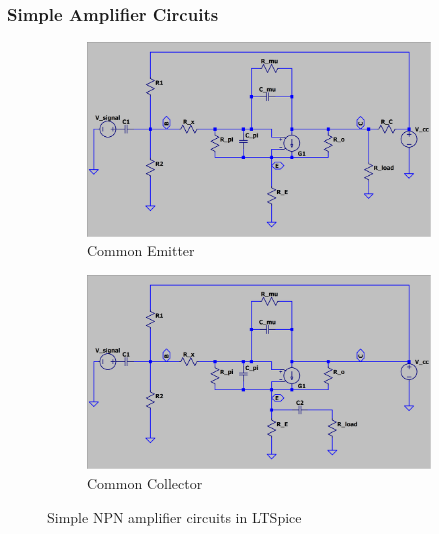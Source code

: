 \documentclass[conference]{IEEEtran}
\begin{document}
\subsubsection{Simple Amplifier Circuits}

\begin{figure}[htbp]
    \centering
    \begin{subfigure}[b]{0.45\textwidth}
        \centerline{\includegraphics[width=\textwidth]{figures/LTSpice-CE.png}}
        \caption{Common Emitter}
        \label{fig:LTSpice-CE-fig}
    \end{subfigure}
    \par\bigskip
    \begin{subfigure}[b]{0.45\textwidth}
        \centerline{\includegraphics[width=\textwidth]{figures/LTSpice-CC.png}}
        \caption{Common Collector}
        \label{fig:LTSpice-CC-fig}
    \end{subfigure}
    \caption{Simple NPN amplifier circuits in LTSpice}
\end{figure}
\end{document}
